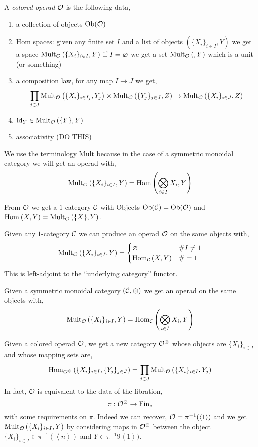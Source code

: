 \documentclass[12pt]{article}
\begin{document}
\begin{defn}
A \textit{colored operad} $\mathcal{O}$ is the following data,
\begin{enumerate}
\item a collection of objects $\mathrm{Ob}(\mathcal{O})$
\item Hom spaces: given any finite set $I$ and a list of objects $(\{ X_i \}_{i \in I}, Y)$ we get a space $\mathrm{Mult}_{\mathcal{O}}\left(\{ X_i \}_{i \in I}, Y\right)$ if $I = \varnothing$ we get a set $\mathrm{Mult}_{\mathcal{O}}\left(, Y\right)$ which is a unit (or something)
\item a composition law, for any map $I \to J$ we get,
\[ \prod_{j \in J} \mathrm{Mult}_{\mathcal{O}}\left(\{ X_i \}_{i \in I_j}, Y_j\right) \times \mathrm{Mult}_{\mathcal{O}}\left(\{ Y_j \}_{j \in J}, Z\right) \to \mathrm{Mult}_{\mathcal{O}}\left( \{X_i \}_{i \in J}, Z\right) \]
\item $\mathrm{id}_Y \in \mathrm{Mult}_{\mathcal{O}}\left(\{Y \}, Y\right)$
\item associativity (DO THIS)
\end{enumerate}
\end{defn}

\begin{rmk}
We use the terminology $\mathrm{Mult}$ because in the case of a symmetric monoidal category we will get an operad with,
\[ \mathrm{Mult}_{\mathcal{O}}\left(\{ X_i \}_{i \in I}, Y\right) = \mathrm{Hom}_{} \left( \bigotimes_{i \in I} X_i, Y \right) \]
\end{rmk}

\begin{rmk}
From $\mathcal{O}$ we get a $1$-category $\mathcal{C}$ with Objects $\mathrm{Ob}(\mathcal{C}) = \mathrm{Ob}(\mathcal{O})$ and $\mathrm{Hom}_{} \left( X, Y \right) = \mathrm{Mult}_{\mathcal{O}}\left( \{ X \}, Y\right)$.
\end{rmk}

\begin{example}
Given any $1$-category $\mathcal{C}$ we can produce an operad $\mathcal{O}$ on the same objects with,
\[ \mathrm{Mult}_{\mathcal{O}}\left( \{ X_i \}_{i \in I} , Y\right) = 
\begin{cases}
\varnothing & \# I \neq 1
\\
\mathrm{Hom}_{\mathcal{C}} \left( X, Y \right) & \# = 1
\end{cases} \]
This is left-adjoint to the ``underlying category'' functor.
\end{example}

\begin{example}
Given a symmetric monoidal category $(\mathcal{C}, \otimes)$ we get an operad on the same objects with,
\[ \mathrm{Mult}_{\mathcal{O}}\left( \{X_i \}_{i \in I}, Y\right) = \mathrm{Hom}_{\mathcal{C}} \left(  \bigotimes_{i \in I} X_i, Y \right) \]
\end{example}

\begin{example}
Given a colored operad $\mathcal{O}$, we get a new category $\mathcal{O}^{\otimes}$ whose objects are $\{ X_i \}_{i \in I}$ and whose mapping sets are,
\[ \mathrm{Hom}_{\mathcal{O}^{\otimes}} \left(  \{ X_i \}_{i \in I} ,  \{Y_j \}_{j \in J}  \right) = \prod_{j \in J} \mathrm{Mult}_{\mathcal{O}}\left( \{ X_i \}_{i \in I} , Y_j\right) \]
In fact, $\mathcal{O}$ is equivalent to the data of the fibration,
\[ \pi : \mathcal{O}^{\otimes} \to \mathrm{Fin}_* \]
with some requirements on $\pi$. Indeed we can recover, $\mathcal{O} = \pi^{-1}(\left< 1 \right>)$ and we get $\mathrm{Mult}_{\mathcal{O}}\left( \{ X_i \}_{i \in I} , Y\right)$ by considering maps in $\mathcal{O}^{\otimes}$ between the object $\{ X_i \}_{i \in I} \in \pi^{-1}(\left< n \right>)$ and $Y \in \pi^{-1}9\left< 1 \right>)$. 
\end{example}
\end{document}
